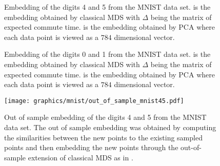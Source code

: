 \begin{figure}[htbp]
  \begin{center}
  \caption{Embedding of the digits 4 and 5 from the MNIST data
    set.  is the embedding obtained by
    classical MDS with $\Delta$ being the matrix of expected commute
    time.  is the embedding obtained by
    PCA where each data point is viewed as a $784$ dimensional vector.
    }
  \label{fig:mnist45}
  \end{center}
\end{figure}    

\begin{figure}[htbp]
  \begin{center}
  \caption{Embedding of the digits 0 and 1 from the MNIST data
    set.  is the embedding obtained by
    classical MDS with $\Delta$ being the matrix of expected commute
    time.  is the embedding obtained by
    PCA where each data point is viewed as a $784$ dimensional vector.
    }
  \label{fig:mnist17}
  \end{center}
\end{figure}    

\begin{figure}[htbp]
  \begin{center}
    \texttt{[image: graphics/mnist/out\_of\_sample\_mnist45.pdf]}
    \caption{Out of sample embedding of the digits 4 and 5 from the MNIST data
    set. The out of sample embedding was obtained by computing the
    similarities between the new points to the existing sampled points
    and then embedding the new points through the out-of-sample extension of
    classical MDS as in \cite{bengio04:_out_lle_isomap_mds_eigen}.}  
  \label{fig:out_of_sample_mnist45}
  \end{center}
\end{figure}    
